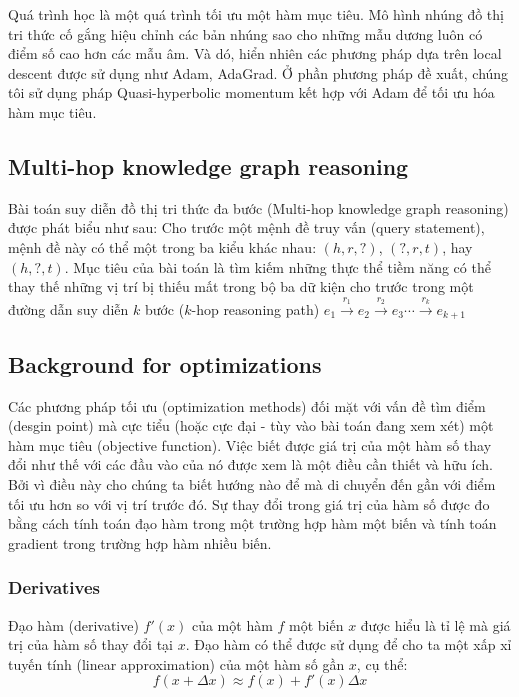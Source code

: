 Quá trình học là một quá trình tối ưu một hàm mục tiêu. Mô hình nhúng đồ thị tri thức cố gắng hiệu chỉnh các bản nhúng sao cho những mẫu dương luôn có điểm số cao hơn các mẫu âm. Và dó, hiển nhiên các phương pháp dựa trên local descent được sử dụng như Adam, AdaGrad. Ở phần phương pháp đề xuất, chúng tôi sử dụng pháp Quasi-hyperbolic momentum kết hợp với Adam để tối ưu hóa hàm mục tiêu.

\subsection{Multi-hop knowledge graph reasoning}

Bài toán suy diễn đồ thị tri thức đa bước (Multi-hop knowledge graph reasoning) được phát biểu như sau: Cho trước một mệnh đề truy vấn (query statement), mệnh đề này có thể một trong ba kiểu khác nhau: $(h, r, ?)$, $(?, r, t)$, hay $(h, ?, t)$. Mục tiêu của bài toán là tìm kiếm những thực thể tiềm năng có thể thay thế những vị trí bị thiếu mất trong bộ ba dữ kiện cho trước trong một đường dẫn suy diễn $k$ bước ($k$-hop reasoning path) $e_1 \overset{r_1}{\rightarrow} e_2 \overset{r_2}{\rightarrow} e_3 \cdots \overset{r_k}{\rightarrow} e_{k+1}$


\subsection{Background for optimizations}

Các phương pháp tối ưu (optimization methods) đối mặt với vấn đề tìm điểm (desgin point) mà cực tiểu (hoặc cực đại - tùy vào bài toán đang xem xét) một hàm mục tiêu (objective function). Việc biết được giá trị của một hàm số thay đổi như thế với các đầu vào của nó được xem là một điều cần thiết và hữu ích. Bởi vì điều này cho chúng ta biết hướng nào để mà di chuyển đến gần với điểm tối ưu hơn so với vị trí trước đó. Sự thay đổi trong giá trị của hàm số được đo bằng cách tính toán đạo hàm trong một trường hợp hàm một biến và tính toán gradient trong trường hợp hàm nhiều biến.

\subsubsection{Derivatives}

Đạo hàm (derivative) $f'(x)$ của một hàm $f$ một biến $x$ được hiểu là tỉ lệ mà giá trị của hàm số thay đổi tại $x$. Đạo hàm có thể được sử dụng để cho ta một xấp xỉ tuyến tính (linear approximation) của một hàm số gần $x$, cụ thể:
\begin{equation}
    f(x + \Delta x) \approx f(x) + f'(x)\Delta x
\end{equation}

